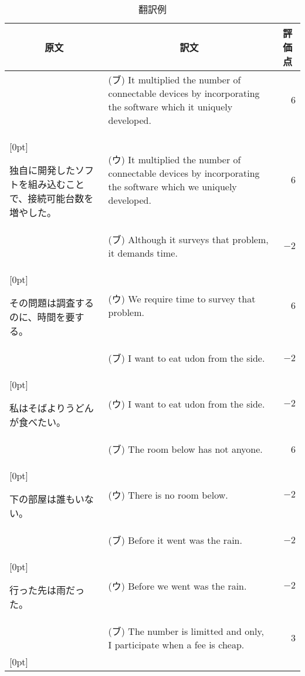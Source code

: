 \begin{table}[hb]
\caption{翻訳例}
\label{tab:trans_example}
\begin{center}
\begin{tabular}{|l|p{}|r|}\hline 
\multicolumn{1}{|c|}{原文}&\multicolumn{1}{c|}{訳文}&\multicolumn{1}{c|}{
評価点}\\\hline\hline
& (ブ) It multiplied the number of connectable devices by incorporating 
the software which it uniquely developed. & 6 \\\cline{2-3}
\raisebox{1.5ex}[0pt]{\begin{minipage}{0.35\columnwidth}
独自に開発したソフトを組み込むことで、接続可能台数を増やした。
\end{minipage}}
& (ウ) It multiplied the number of connectable devices by incorporating 
the software which we uniquely developed. & 6  \\\hline
& (ブ) Although it surveys that problem, it demands time. & $-2$ \\\cline{2-3}
\raisebox{1.5ex}[0pt]{\begin{minipage}{0.35\columnwidth}
その問題は調査するのに、時間を要する。
\end{minipage}} 
& (ウ) We require time to survey that problem. & 6 \\\hline
& (ブ) I want to eat udon from the side. & $-2$ \\\cline{2-3}
\raisebox{1.5ex}[0pt]{\begin{minipage}{0.35\columnwidth}
私はそばよりうどんが食べたい。
\end{minipage}}
& (ウ) I want to eat udon from the side. & $-2$ \\\hline
& (ブ) The room below has not anyone. & 6 \\\cline{2-3}
\raisebox{1.5ex}[0pt]{\begin{minipage}{0.35\columnwidth}
下の部屋は誰もいない。
\end{minipage}} 
& (ウ) There is no room below. & $-2$ \\\hline
& (ブ) Before it went was the rain. & $-2$ \\\cline{2-3}
\raisebox{1.5ex}[0pt]{\begin{minipage}{0.35\columnwidth}
行った先は雨だった。
\end{minipage}}
& (ウ) Before we went was the rain. & $-2$ \\\hline
& (ブ) The number is limitted and only, I participate when a fee is cheap. 
& 3 \\\cline{2-3}
\raisebox{1.5ex}[0pt]{\begin{minipage}{0.35\columnwidth}

\end{minipage}}
\end{tabular}
\end{center}
\end{table}
